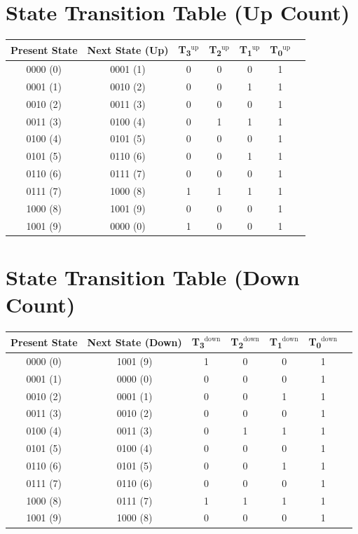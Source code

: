 \documentclass[a4paper,12pt]{article}
\begin{document}
\section*{State Transition Table (Up Count)}
\begin{center}
\begin{tabular}{ccccccc}
\toprule
Present State & Next State (Up) & T\textsubscript{3}$^\text{up}$ & T\textsubscript{2}$^\text{up}$ & T\textsubscript{1}$^\text{up}$ & T\textsubscript{0}$^\text{up}$ \\
\midrule
0000 (0) & 0001 (1) & 0 & 0 & 0 & 1 \\
0001 (1) & 0010 (2) & 0 & 0 & 1 & 1 \\
0010 (2) & 0011 (3) & 0 & 0 & 0 & 1 \\
0011 (3) & 0100 (4) & 0 & 1 & 1 & 1 \\
0100 (4) & 0101 (5) & 0 & 0 & 0 & 1 \\
0101 (5) & 0110 (6) & 0 & 0 & 1 & 1 \\
0110 (6) & 0111 (7) & 0 & 0 & 0 & 1 \\
0111 (7) & 1000 (8) & 1 & 1 & 1 & 1 \\
1000 (8) & 1001 (9) & 0 & 0 & 0 & 1 \\
1001 (9) & 0000 (0) & 1 & 0 & 0 & 1 \\
\bottomrule
\end{tabular}
\end{center}

\section*{State Transition Table (Down Count)}
\begin{center}
\begin{tabular}{ccccccc}
\toprule
Present State & Next State (Down) & T\textsubscript{3}$^\text{down}$ & T\textsubscript{2}$^\text{down}$ & T\textsubscript{1}$^\text{down}$ & T\textsubscript{0}$^\text{down}$ \\
\midrule
0000 (0) & 1001 (9) & 1 & 0 & 0 & 1 \\
0001 (1) & 0000 (0) & 0 & 0 & 0 & 1 \\
0010 (2) & 0001 (1) & 0 & 0 & 1 & 1 \\
0011 (3) & 0010 (2) & 0 & 0 & 0 & 1 \\
0100 (4) & 0011 (3) & 0 & 1 & 1 & 1 \\
0101 (5) & 0100 (4) & 0 & 0 & 0 & 1 \\
0110 (6) & 0101 (5) & 0 & 0 & 1 & 1 \\
0111 (7) & 0110 (6) & 0 & 0 & 0 & 1 \\
1000 (8) & 0111 (7) & 1 & 1 & 1 & 1 \\
1001 (9) & 1000 (8) & 0 & 0 & 0 & 1 \\
\bottomrule
\end{tabular}
\end{center}
\end{document}
